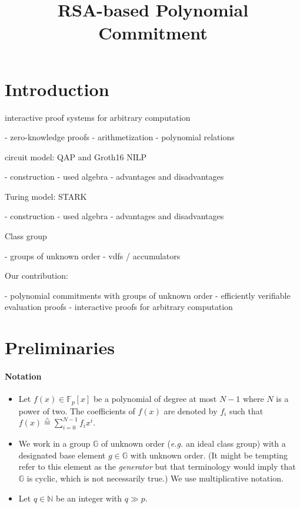 \documentclass{article}
\begin{document}
\title{RSA-based Polynomial Commitment}
\maketitle

\section{Introduction}

interactive proof systems for arbitrary computation

 - zero-knowledge proofs
 - arithmetization
 - polynomial relations
 
circuit model: QAP and Groth16 NILP

 - construction
 - used algebra
 - advantages and disadvantages
 
Turing model: STARK

 - construction
 - used algebra
 - advantages and disadvantages

Class group

 - groups of unknown order
 - vdfs / accumulators

Our contribution:

 - polynomial commitments with groups of unknown order
 - efficiently verifiable evaluation proofs
 - interactive proofs for arbitrary computation


\section{Preliminaries}
\paragraph{Notation}
\begin{itemize}
\item Let $f(x) \in \mathbb{F}_p[x]$ be a polynomial of degree at most $N-1$ where $N$ is a power of two. The coefficients of $f(x)$ are denoted by $f_i$ such that $f(x) \stackrel{\triangle}{=} \sum_{i=0}^{N-1} f_i x^i$.
\item We work in a group $\mathbb{G}$ of unknown order (\emph{e.g.} an ideal class group) with a designated base element $g \in \mathbb{G}$ with unknown order. (It might be tempting refer to this element as the \emph{generator} but that terminology would imply that $\mathbb{G}$ is cyclic, which is not necessarily true.) We use multiplicative notation.
\item Let $q \in \mathbb{N}$ be an integer with $q \gg p$.
\end{itemize}
\end{document}
